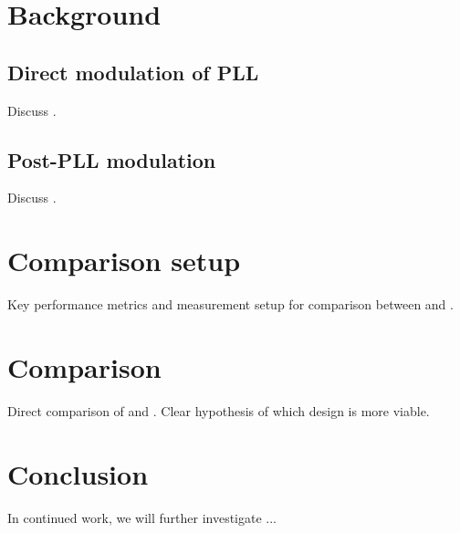 \documentclass{IEEEtran}
\begin{document}
\section{Background}
\subsection{Direct modulation of PLL}
Discuss \cite{hashimoto2018}.
\subsection{Post-PLL modulation}
Discuss \cite{wilcox2015}.

\section{Comparison setup}
Key performance metrics and measurement setup for comparison between \cite{hashimoto2018} and \cite{wilcox2015}.

\section{Comparison}
Direct comparison of \cite{hashimoto2018} and \cite{wilcox2015}. Clear hypothesis of which design is more viable.

\section{Conclusion}
In continued work, we will further investigate ...



\begingroup
\raggedright

\endgroup
\end{document}

